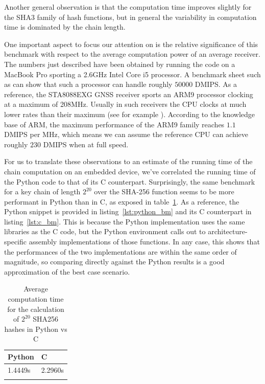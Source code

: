 Another general observation is that the computation time improves slightly for
the SHA3 family of hash functions, but in general the variability in computation
time is dominated by the chain length.

One important aspect to focus our attention on is the relative significance of
this benchmark with respect to the average computation power of an average
receiver. The numbers just described have been obtained by running the code on a
MacBook Pro sporting a 2.6GHz Intel Core i5 processor. A benchmark sheet such as
\cite{bm_intel_core_i5} can show that such a processor can handle roughly $50
000$ DMIPS. As a reference, the STA8088EXG GNSS receiver \cite{st_rec_specs}
sports an ARM9 processor clocking at a maximum of 208MHz. Usually in such
receivers the CPU clocks at much lower rates than their maximum (see for example
\cite{mediatek_specs}). According to the knowledge base of ARM, the maximum
performance of the ARM9 family reaches $1.1$ DMIPS per MHz, which means we can
assume the reference CPU can achieve roughly $230$ DMIPS when at full speed.

For us to translate these observations to an estimate of the running time of the
chain computation on an embedded device, we've correlated the running time of
the Python code to that of its C counterpart. Surprisingly, the same benchmark
for a key chain of length $2^{20}$ over the SHA-256 function seems to be more
performant in Python than in C, as exposed in table~\ref{table:bm_c_python}. As a
reference, the Python snippet is provided in listing~\ref{lst:python_bm} and its C
counterpart in listing~\ref{lst:c_bm}. This is because the Python implementation
uses the same libraries as the C code, but the Python environment calls out to
architecture-specific assembly implementations of those functions. In any case,
this shows that the performances of the two implementations are within the same
order of magnitude, so comparing directly against the Python results is a good
approximation of the best case scenario.





\begin{longtable}[]{@{}ll@{}}
\toprule
Python & C\tabularnewline
\midrule
\endhead
1.4449s & 2.2960s\tabularnewline
\bottomrule
\caption{Average computation time for the calculation of $2^{20}$ SHA256 hashes
in Python vs C}
\label{table:bm_c_python}
\end{longtable}

